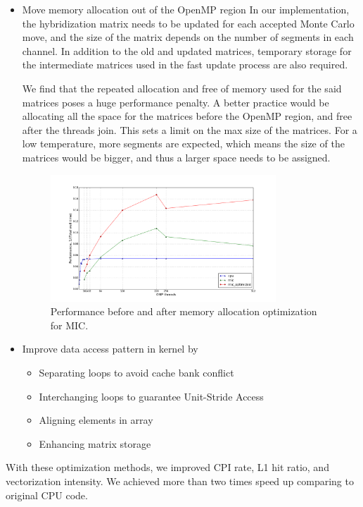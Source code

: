\begin{itemize}
\item Move memory allocation out of the OpenMP region
 In our implementation, the hybridization matrix needs to be updated for each 
accepted Monte Carlo move, and the size of the matrix depends on the number of 
segments in each channel. In addition to the old and updated matrices, temporary
storage for the intermediate matrices used in the fast update process are also
required. 

We find that the repeated allocation and free of memory used for the
said matrices poses a huge performance penalty. A better practice would be 
allocating all the space for the matrices before the OpenMP region, and free 
after the threads join. This sets a limit on the max size of the matrices. For
a low temperature, more segments are expected, which means the size of the matrices
would be bigger, and thus a larger space needs to be assigned. 

\begin{figure}
  \centering
  \includegraphics[width=0.8\textwidth] {img/mic/memory.png}
  \caption{Performance before and after memory allocation optimization for MIC.}
\end{figure}


\item Improve data access pattern in kernel by
\begin{itemize}
  \item Separating loops to avoid cache bank conflict
  \item Interchanging loops to guarantee Unit-Stride Access
  \item Aligning elements in array
  \item Enhancing matrix storage
\end{itemize}
\end{itemize}
With these optimization methods, we improved CPI rate, L1 hit ratio, and 
vectorization intensity. We achieved more than two times speed up comparing to 
original CPU code.


